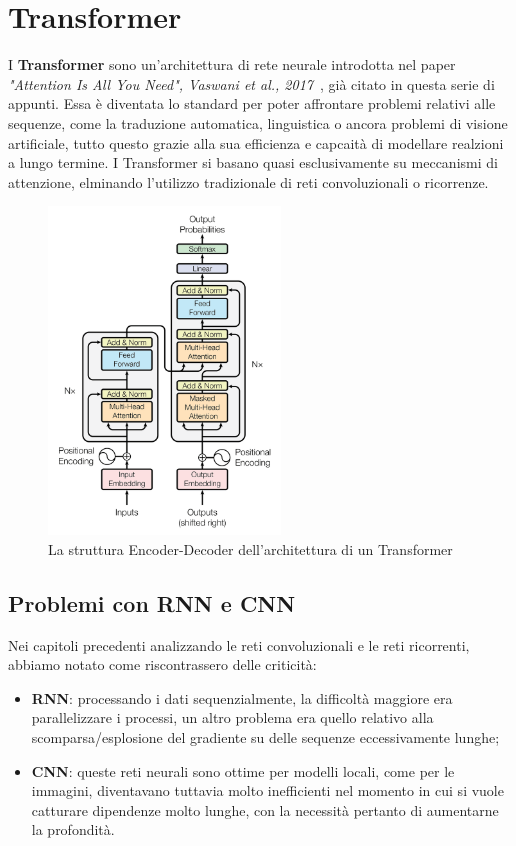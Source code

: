 \chapter{Transformer}\label{cap:14}

I \textbf{Transformer} sono un'architettura di rete neurale introdotta nel paper \textit{"Attention Is All You Need", Vaswani et al., 2017}~\cite{vaswani2017attention}, già citato in questa serie di appunti. Essa è diventata lo standard per poter affrontare problemi relativi alle sequenze, come la traduzione automatica, linguistica o ancora problemi di visione artificiale, tutto questo grazie alla sua efficienza e capcaità di modellare realzioni a lungo termine. I Transformer si basano quasi esclusivamente su meccanismi di attenzione, elminando l'utilizzo tradizionale di reti convoluzionali o ricorrenze.

\begin{figure}
    \centering
    \includegraphics[width=0.55\textwidth]{figure/TransformerArch.png}
    \caption{La struttura Encoder-Decoder dell'architettura di un Transformer}
    \label{fig:tranArch}
\end{figure}

\section{Problemi con RNN e CNN}
Nei capitoli precedenti analizzando le reti convoluzionali e le reti ricorrenti, abbiamo notato come riscontrassero delle criticità:
\begin{itemize}
    \item \textbf{RNN}: processando i dati sequenzialmente, la difficoltà maggiore era parallelizzare i processi, un altro problema era quello relativo alla scomparsa/esplosione del gradiente su delle sequenze eccessivamente lunghe;
    \item \textbf{CNN}: queste reti neurali sono ottime per modelli locali, come per le immagini,  diventavano tuttavia molto inefficienti nel momento in cui si vuole catturare dipendenze molto lunghe, con la necessità pertanto di aumentarne la profondità.
\end{itemize}

